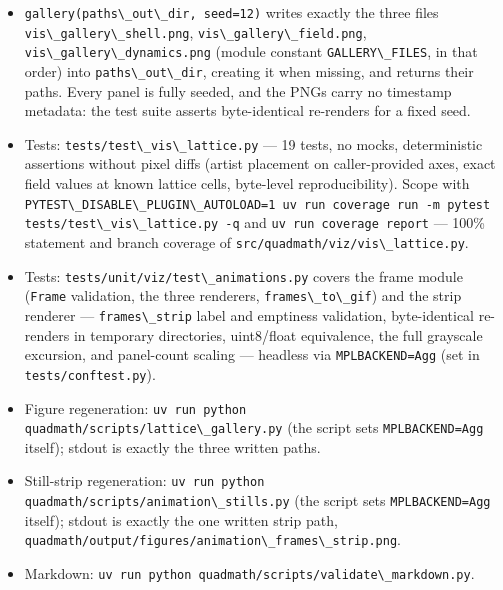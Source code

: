 \documentclass[
  10pt,
]{article}
\newcommand{\passthrough}[1]{#1}
\providecommand{\tightlist}{%
  \setlength{\itemsep}{0pt}\setlength{\parskip}{0pt}}
\begin{document}
\begin{itemize}
\tightlist
\item
  \passthrough{\lstinline!gallery(paths\_out\_dir, seed=12)!} writes
  exactly the three files
  \passthrough{\lstinline!vis\_gallery\_shell.png!},
  \passthrough{\lstinline!vis\_gallery\_field.png!},
  \passthrough{\lstinline!vis\_gallery\_dynamics.png!} (module constant
  \passthrough{\lstinline!GALLERY\_FILES!}, in that order) into
  \passthrough{\lstinline!paths\_out\_dir!}, creating it when missing,
  and returns their paths. Every panel is fully seeded, and the PNGs
  carry no timestamp metadata: the test suite asserts byte-identical
  re-renders for a fixed seed.
\item
  Tests: \passthrough{\lstinline!tests/test\_vis\_lattice.py!} --- 19
  tests, no mocks, deterministic assertions without pixel diffs (artist
  placement on caller-provided axes, exact field values at known lattice
  cells, byte-level reproducibility). Scope with
  \passthrough{\lstinline!PYTEST\_DISABLE\_PLUGIN\_AUTOLOAD=1 uv run coverage run -m pytest tests/test\_vis\_lattice.py -q!}
  and \passthrough{\lstinline!uv run coverage report!} --- 100\%
  statement and branch coverage of
  \passthrough{\lstinline!src/quadmath/viz/vis\_lattice.py!}.
\item
  Tests: \passthrough{\lstinline!tests/unit/viz/test\_animations.py!}
  covers the frame module (\passthrough{\lstinline!Frame!} validation,
  the three renderers, \passthrough{\lstinline!frames\_to\_gif!}) and
  the strip renderer --- \passthrough{\lstinline!frames\_strip!} label
  and emptiness validation, byte-identical re-renders in temporary
  directories, uint8/float equivalence, the full grayscale excursion,
  and panel-count scaling --- headless via
  \passthrough{\lstinline!MPLBACKEND=Agg!} (set in
  \passthrough{\lstinline!tests/conftest.py!}).
\item
  Figure regeneration:
  \passthrough{\lstinline!uv run python quadmath/scripts/lattice\_gallery.py!}
  (the script sets \passthrough{\lstinline!MPLBACKEND=Agg!} itself);
  stdout is exactly the three written paths.
\item
  Still-strip regeneration:
  \passthrough{\lstinline!uv run python quadmath/scripts/animation\_stills.py!}
  (the script sets \passthrough{\lstinline!MPLBACKEND=Agg!} itself);
  stdout is exactly the one written strip path,
  \passthrough{\lstinline!quadmath/output/figures/animation\_frames\_strip.png!}.
\item
  Markdown:
  \passthrough{\lstinline!uv run python quadmath/scripts/validate\_markdown.py!}.
\end{itemize}
\end{document}
